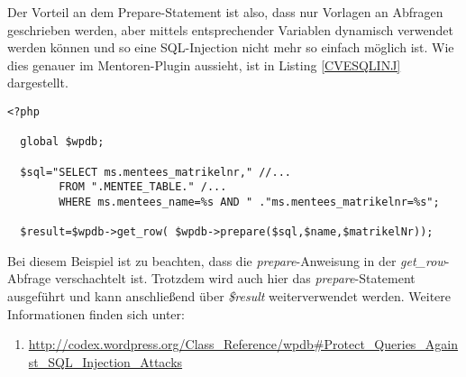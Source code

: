 Der Vorteil an dem Prepare-Statement ist also, dass nur Vorlagen an Abfragen geschrieben werden, aber mittels entsprechender Variablen dynamisch verwendet werden können und so eine SQL-Injection nicht mehr so einfach möglich ist. \newline
Wie dies genauer im Mentoren-Plugin aussieht, ist in Listing \ref{CVESQLINJ} dargestellt.
\begin{lstlisting}
<?php
  
  global $wpdb;
  
  $sql="SELECT ms.mentees_matrikelnr," //... 
        FROM ".MENTEE_TABLE." /...
        WHERE ms.mentees_name=%s AND " ."ms.mentees_matrikelnr=%s";
        
  $result=$wpdb->get_row( $wpdb->prepare($sql,$name,$matrikelNr));
\end{lstlisting}
Bei diesem Beispiel ist zu beachten, dass die \emph{prepare}-Anweisung in der \emph{get\_row}-Abfrage verschachtelt ist. Trotzdem wird auch hier das \emph{prepare}-Statement ausgeführt und kann anschließend über \emph{\$result} weiterverwendet werden.\newline
Weitere Informationen finden sich unter: 
\begin{enumerate}
	\item \url{http://codex.wordpress.org/Class\_Reference/wpdb\#Protect\_Queries\_Against\_SQL\_Injection\_Attacks}
\end{enumerate}
 \newpage